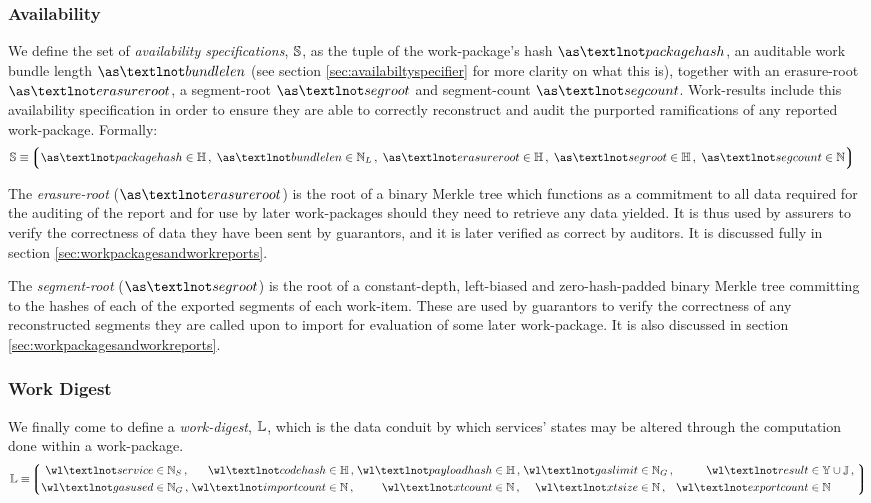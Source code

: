\subsubsection{Availability}
We define the set of \emph{availability specifications}, $\mathbb{S}$, as the tuple of the work-package's hash $\as¬packagehash$, an auditable work bundle length $\as¬bundlelen$ (see section \ref{sec:availabiltyspecifier} for more clarity on what this is), together with an erasure-root $\as¬erasureroot$, a segment-root $\as¬segroot$ and segment-count $\as¬segcount$. Work-results include this availability specification in order to ensure they are able to correctly reconstruct and audit the purported ramifications of any reported work-package. Formally:
\begin{align}
  \avspec &\equiv \tuple{
    \isa{\as¬packagehash}{\hash}\,,\;
    \isa{\as¬bundlelen}{\N_L}\,,\;
    \isa{\as¬erasureroot}{\hash}\,,\;
    \isa{\as¬segroot}{\hash}\,,\;
    \isa{\as¬segcount}{\N}
  }
\end{align}

The \emph{erasure-root} ($\as¬erasureroot$) is the root of a binary Merkle tree which functions as a commitment to all data required for the auditing of the report and for use by later work-packages should they need to retrieve any data yielded. It is thus used by assurers to verify the correctness of data they have been sent by guarantors, and it is later verified as correct by auditors. It is discussed fully in section \ref{sec:workpackagesandworkreports}.

The \emph{segment-root} ($\as¬segroot$) is the root of a constant-depth, left-biased and zero-hash-padded binary Merkle tree committing to the hashes of each of the exported segments of each work-item. These are used by guarantors to verify the correctness of any reconstructed segments they are called upon to import for evaluation of some later work-package. It is also discussed in section \ref{sec:workpackagesandworkreports}.

\subsubsection{Work Digest}
We finally come to define a \emph{work-digest}, $\mathbb{L}$, which is the data conduit by which services' states may be altered through the computation done within a work-package.
\begin{equation}\label{eq:workdigest}
  \mathbb{L} \equiv \tuple{
    \begin{alignedat}{9}
      \isa{\wl¬service&}{\N_S}\,,\;
      \isa{&\wl¬codehash&}{\hash}\,,\;
      \isa{&\wl¬payloadhash&}{\hash}\,,\;
      \isa{&\wl¬gaslimit&}{\gas}\,,\;
      \isa{&\wl¬result&}{\blob \cup \mathbb{J}}\,,\;\\
      \isa{\wl¬gasused&}{\gas}\,,\; %
      \isa{&\wl¬importcount&}{\N}\,,\; %
      \isa{&\wl¬xtcount&}{\N}\,,\; %
      \isa{&\wl¬xtsize&}{\N}\,,\; %
      \isa{&\wl¬exportcount&}{\N} %
    \end{alignedat}
  }
\end{equation}

